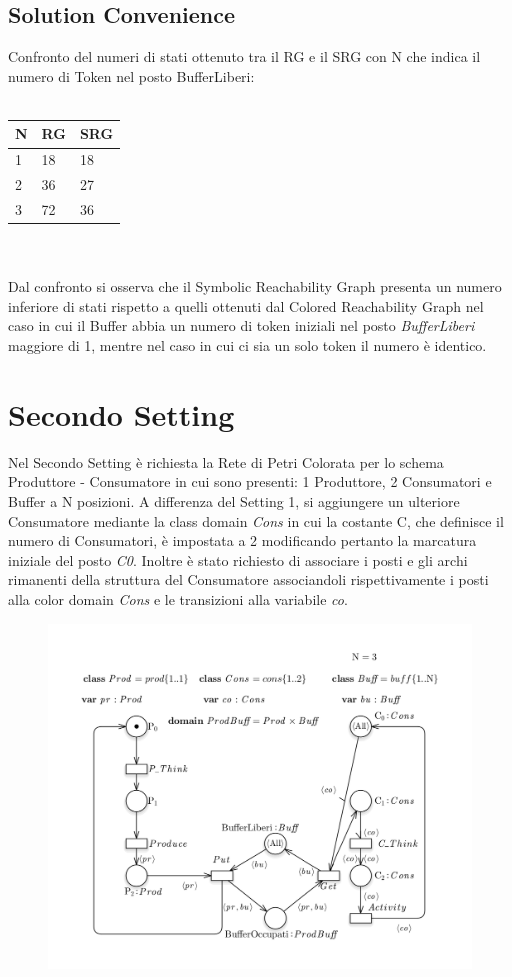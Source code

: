 \documentclass{article}
\begin{document}
\subsection{Solution Convenience}
Confronto del numeri di stati ottenuto tra il RG e il SRG con N che indica il numero di Token nel posto BufferLiberi:
\\\\
\begin{tabular}{|p{3cm}||p{3cm}|p{3cm}|}
\hline
N & RG & SRG\\
\hline
1&18&18\\
2&36&27\\
3&72&36\\
\hline
\end{tabular}
\\\\Dal confronto si osserva che il Symbolic Reachability Graph presenta un numero inferiore di stati rispetto a quelli ottenuti dal Colored Reachability Graph nel caso in cui il Buffer abbia un numero di token iniziali nel posto \textit{BufferLiberi} maggiore di 1, mentre nel caso in cui ci sia un solo token il numero è identico. 
\clearpage
\section{Secondo Setting}
Nel Secondo Setting è richiesta la Rete di Petri Colorata per lo schema Produttore - Consumatore in cui sono presenti: 1 Produttore, 2 Consumatori e Buffer a N posizioni. 
A differenza del Setting 1, si aggiungere un ulteriore Consumatore mediante la class domain \textit{Cons} in cui la costante C, che definisce il numero di Consumatori, è impostata a 2 modificando pertanto la marcatura iniziale del posto \textit{C0}. Inoltre è stato richiesto di associare i posti e gli archi rimanenti della struttura del Consumatore associandoli rispettivamente i posti alla color domain \textit{Cons} e le transizioni alla variabile \textit{co}.
\begin{figure}[h] 
\centering
\includegraphics[scale=0.4]{Setting2def.png}
\end{figure}
\end{document}
